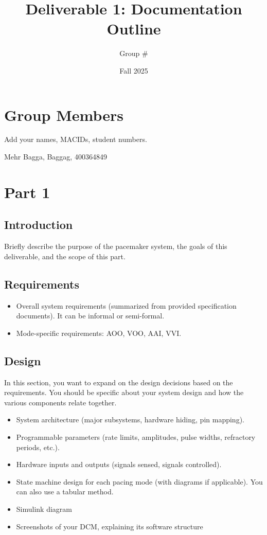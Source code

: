 \documentclass{article}
\title{Deliverable 1: Documentation Outline }
\author{Group \#}
\date{Fall 2025}
\begin{document}
\maketitle
\newpage

\tableofcontents
\newpage

\section{Group Members}

Add your names, MACIDs, student numbers.

Mehr Bagga, Baggag, 400364849

\section{Part 1}

\subsection{Introduction}
Briefly describe the purpose of the pacemaker system, the goals of this deliverable, and the scope of this part.

\subsection{Requirements}
\begin{itemize}
    \item Overall system requirements (summarized from provided specification documents). It can be informal or semi-formal.
    \item Mode-specific requirements: AOO, VOO, AAI, VVI.
\end{itemize}

\subsection{Design}

In this section, you want to expand on the design decisions based on the requirements. You should be specific about your system design and how the various components relate together.

\begin{itemize}
    \item System architecture (major subsystems, hardware hiding, pin mapping).
    \item Programmable parameters (rate limits, amplitudes, pulse widths, refractory periods, etc.).
    \item Hardware inputs and outputs (signals sensed, signals controlled).
    \item State machine design for each pacing mode (with diagrams if applicable). You can also use a tabular method.
    \item Simulink diagram
    \item Screenshots of your DCM, explaining its software structure
\end{itemize}
\end{document}
